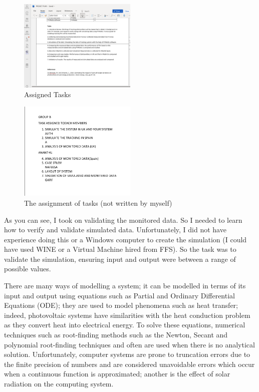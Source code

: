 \documentclass{article}
\begin{document}
 \begin{figure}[h]
\caption{Assigned Tasks}
\centering
\includegraphics[width=0.5\textwidth]{images/feb/tasklist.png}
\end{figure}
 
\begin{figure}[h]
\caption{The assignment of tasks (not written by myself)}
\centering
\includegraphics[width=0.5\textwidth]{images/feb/task_list_group.png}
\end{figure}

As you can see, I took on validating the monitored data. So I needed to learn how to verify and validate simulated data. Unfortunately, I did not have experience doing this or a Windows computer to create the simulation (I could have used WINE or a Virtual Machine hired from FFS). So the task was to validate the simulation, ensuring input and output were between a range of possible values. 

There are many ways of modelling a system; it can be modelled in terms of its input and output using equations such as Partial and Ordinary Differential Equations (ODE); they are used to model phenomena such as heat transfer; indeed, photovoltaic systems have similarities with the heat conduction problem as they convert heat into electrical energy. To solve these equations, numerical techniques such as root-finding methods such as the Newton, Secant and polynomial root-finding techniques and often are used when there is no analytical solution. Unfortunately, computer systems are prone to truncation errors due to the finite precision of numbers and are considered unavoidable errors which occur when a continuous function is approximated; another is the effect of solar radiation on the computing system. 
\end{document}
